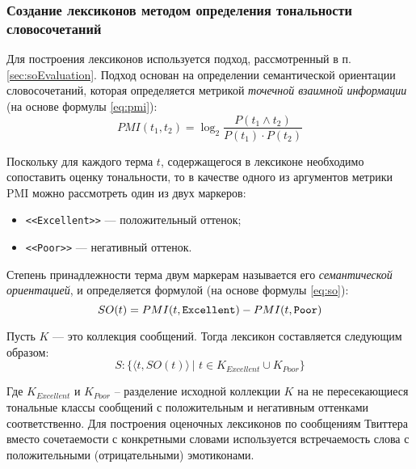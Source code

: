     \lstset{style=python}
    


    \subsubsection{Создание лексиконов методом определения тональности словосочетаний}
    Для построения лексиконов используется подход, рассмотренный в п.
    \ref{sec:soEvaluation}.
    Подход основан на определении семантической ориентации словосочетаний, которая
    определяется метрикой {\it точечной взаимной информации} (на основе формулы
    \ref{eq:pmi}):
    \begin{equation}
        \label{eq:pmi2}
        PMI(t_1, t_2) = \log_2 \dfrac{P(t_1 \wedge t_2)}{P(t_1) \cdot P(t_2)}
    \end{equation}

    Поскольку для каждого терма $t$, содержащегося в лексиконе необходимо
    сопоставить оценку тональности, то в качестве одного из аргументов метрики
    PMI можно рассмотреть один из двух маркеров:
    \begin{itemize}
        \item {\tt <<Excellent>>} --- положительный оттенок;
        \item {\tt <<Poor>>} --- негативный оттенок.
    \end{itemize}

    Степень принадлежности терма двум маркерам называется его {\it семантической
    ориентацией}, и определяется формулой (на основе формулы \ref{eq:so}):
    \begin{equation}
        SO(t) = PMI(t, {\tt Excellent}) - PMI(t, {\tt Poor})
    \end{equation}

    Пусть $K$ --- это коллекция сообщений. Тогда лексикон составляется следующим
    образом:
    \begin{equation}
        S : \{\langle t, SO(t) \rangle \hspace{2pt}| \hspace{4pt} t \in K_{Excellent} \cup K_{Poor}\}
    \end{equation}

    Где $K_{Excellent}$ и $K_{Poor}$ – разделение исходной коллекции $K$ на
    не пересекающиеся тональные классы сообщений с положительным и негативным
    оттенками соответственно.  Для построения оценочных лексиконов по сообщениям
    Твиттера вместо сочетаемости с конкретными словами используется встречаемость
    слова с положительными (отрицательными) эмотиконами.

